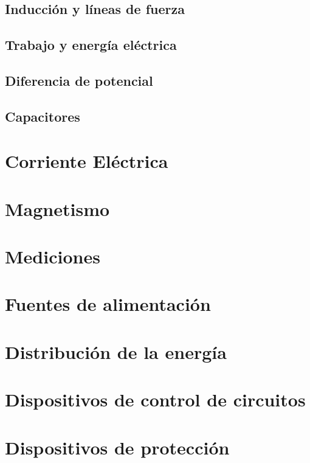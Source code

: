 \documentclass{article}
\begin{document}
\pagebreak


	\subsection{Inducción y líneas de fuerza}
	\subsection{Trabajo y energía eléctrica}
	\subsection{Diferencia de potencial}
	\subsection{Capacitores}

\section{Corriente Eléctrica}
\section{Magnetismo}
\section{Mediciones}
\section{Fuentes de alimentación}
\section{Distribución de la energía}
\section{Dispositivos de control de circuitos}
\section{Dispositivos de protección}
\end{document}
